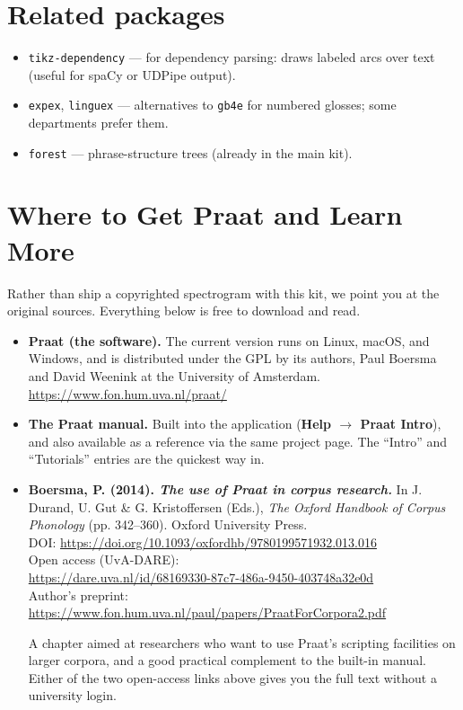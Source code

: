 \documentclass[11pt,a4paper]{article}
\begin{document}
\section{Related packages}

\begin{itemize}
    \item \texttt{tikz-dependency} --- for dependency parsing: draws labeled
          arcs over text (useful for spaCy or UDPipe output).
    \item \texttt{expex}, \texttt{linguex} --- alternatives to \texttt{gb4e}
          for numbered glosses; some departments prefer them.
    \item \texttt{forest} --- phrase-structure trees (already in the main kit).
\end{itemize}

\section{Where to Get Praat and Learn More}

Rather than ship a copyrighted spectrogram with this kit, we point you at the
original sources. Everything below is free to download and read.

\begin{itemize}
    \item \textbf{Praat (the software).} The current version runs on Linux,
          macOS, and Windows, and is distributed under the GPL by its authors,
          Paul Boersma and David Weenink at the University of Amsterdam. \\
          \url{https://www.fon.hum.uva.nl/praat/}

    \item \textbf{The Praat manual.} Built into the application
          (\textbf{Help $\to$ Praat Intro}), and also available as a reference
          via the same project page. The ``Intro'' and ``Tutorials'' entries
          are the quickest way in.

    \item \textbf{Boersma, P. (2014). \emph{The use of Praat in corpus
          research.}} In J. Durand, U. Gut \& G. Kristoffersen (Eds.),
          \emph{The Oxford Handbook of Corpus Phonology} (pp. 342--360).
          Oxford University Press. \\
          DOI: \url{https://doi.org/10.1093/oxfordhb/9780199571932.013.016} \\
          Open access (UvA-DARE): \\ \url{https://dare.uva.nl/id/68169330-87c7-486a-9450-403748a32e0d} \\
          Author's preprint: \\ \url{https://www.fon.hum.uva.nl/paul/papers/PraatForCorpora2.pdf}

          \noindent A chapter aimed at researchers who want to use Praat's
          scripting facilities on larger corpora, and a good practical
          complement to the built-in manual. Either of the two open-access
          links above gives you the full text without a university login.
\end{itemize}
\end{document}
